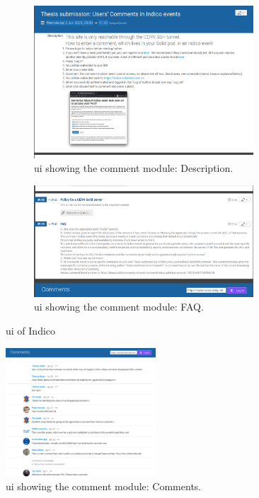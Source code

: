 \begin{figure}
    \centering
    \begin{subfigure}{.5\textwidth}
      \centering
        \includegraphics[width=0.9\textwidth]{prototype/poc-solid-comment-description.png}
        \caption{\gls{ui} showing the comment module: Description.}
        \label{fig:poc-solid-comment-description}
    \end{subfigure}%
    \begin{subfigure}{.5\textwidth}
      \centering
    \includegraphics[width=0.9\textwidth]{prototype/poc-solid-comment-agenda.png}
    \caption{\gls{ui} showing the comment module: FAQ.}
    \label{fig:poc-solid-comment-agenda}
    \end{subfigure}
    \caption{\gls{ui} of Indico}
    \label{fig:test}
\end{figure}

\begin{figure}[ht!]
    \centering
    \includegraphics[width=0.5\textwidth]{prototype/poc-solid-comment-comments.png}
    \caption{\gls{ui} showing the comment module: Comments.}
    \label{fig:poc-solid-comment-comments}
\end{figure}

